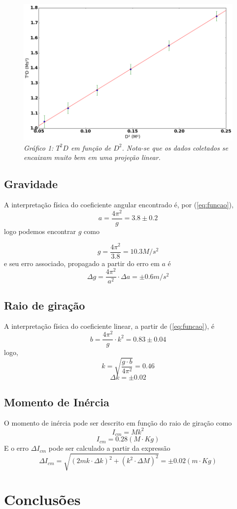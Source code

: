 \documentclass[12pt,a4paper]{article}
\begin{document}
\begin{figure}[!hbtbp]

\includegraphics[scale=0.55]{index.png} 
\emph{Gráfico 1: $T^2D$ em função de $D^2$. Nota-se que os dados coletados se encaixam muito bem em uma projeção linear.}

\label{fig:Grafico}
\end{figure}
\subsection{Gravidade}
A interpretação física do coeficiente angular encontrado é, por (\ref{eq:funcao}),
 $$ a = \frac{4\pi^2}{g} = 3.8 \pm 0.2$$
  logo podemos encontrar $g$ como 

  $$ g = \frac{4\pi^2}{3.8} = 10.3 M/s^2 $$ 
  e seu erro associado, propagado a partir do erro em $a$ é
  $$ \Delta g = \frac{4\pi^2}{a^2} \cdot \Delta a = \pm 0.6 m/s^2 $$
  
\subsection{Raio de giração}

A interpretação física do coeficiente linear, a partir de (\ref{eq:funcao}), é 
$$ b = \frac{4\pi^2}{g} \cdot k^2 = 0.83 \pm 0.04 $$
logo, 
$$ k = \sqrt{\frac{g \cdot b}{4\pi^2}} = 0.46 $$
$$ \Delta k = \pm 0.02 $$

\subsection{Momento de Inércia}
O momento de inércia pode ser descrito em função do raio de giração como 
$$ I_{cm}  = Mk^2 $$
$$ I_{cm}  = 0.28 (M \cdot Kg)$$
E o erro $ \Delta I_{cm}$ pode ser calculado a partir da expressão 
$$\Delta I_{cm}  =\sqrt{(2mk \cdot \Delta k)^2 + (k^2 \cdot \Delta M)^2} = \pm 0.02 (m \cdot Kg) $$

\section{Conclusões}
\end{document}
